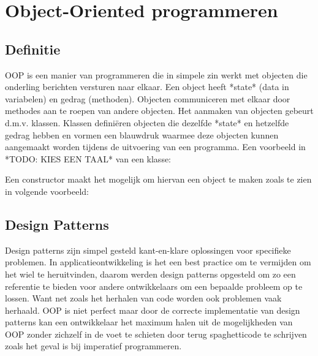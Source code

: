 \section{Object-Oriented programmeren}
\subsection{Definitie}
OOP is een manier van programmeren die in simpele zin werkt met objecten die onderling berichten versturen naar elkaar. Een object heeft *state* (data in variabelen) en gedrag (methoden). Objecten communiceren met elkaar door methodes aan te roepen van andere objecten. Het aanmaken van objecten gebeurt d.m.v. klassen. Klassen definiëren objecten die dezelfde *state* en hetzelfde gedrag hebben en vormen een blauwdruk waarmee deze objecten kunnen aangemaakt worden tijdens de uitvoering van een programma. Een voorbeeld in *TODO: KIES EEN TAAL* van een klasse: 


Een constructor maakt het mogelijk om hiervan een object te maken zoals te zien in volgende voorbeeld:



\subsection{Design Patterns}
Design patterns zijn simpel gesteld kant-en-klare oplossingen voor specifieke problemen. In applicatieontwikkeling is het een best practice om te vermijden om het wiel te heruitvinden, daarom werden design patterns opgesteld om zo een referentie te bieden voor andere ontwikkelaars om een bepaalde probleem op te lossen. Want net zoals het herhalen van code worden ook problemen vaak herhaald. OOP is niet perfect maar door de correcte implementatie van design patterns kan een ontwikkelaar het maximum halen uit de mogelijkheden van OOP zonder zichzelf in de voet te schieten door terug spaghetticode te schrijven zoals het geval is bij imperatief programmeren.


